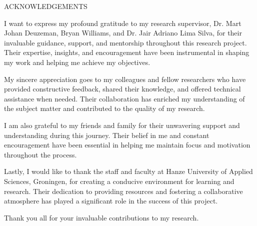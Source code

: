 \begin{center}
    ACKNOWLEDGEMENTS
    \vspace{5mm} %
\end{center}

I want to express my profound gratitude to my research supervisor, Dr. Mart Johan Deuzeman, Bryan Williams, and Dr. Jair Adriano Lima Silva, for their invaluable guidance, support, and mentorship throughout this research project. Their expertise, insights, and encouragement have been instrumental in shaping my work and helping me achieve my objectives.

My sincere appreciation goes to my colleagues and fellow researchers who have provided constructive feedback, shared their knowledge, and offered technical assistance when needed. Their collaboration has enriched my understanding of the subject matter and contributed to the quality of my research.

I am also grateful to my friends and family for their unwavering support and understanding during this journey. Their belief in me and constant encouragement have been essential in helping me maintain focus and motivation throughout the process.

Lastly, I would like to thank the staff and faculty at Hanze University of Applied Sciences, Groningen, for creating a conducive environment for learning and research. Their dedication to providing resources and fostering a collaborative atmosphere has played a significant role in the success of this project.

Thank you all for your invaluable contributions to my research.
